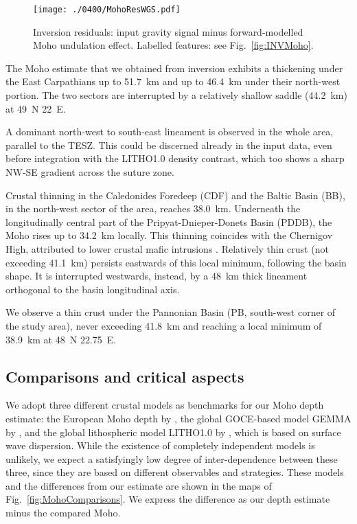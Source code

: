 {\begin{figure}
	\begin{adjustbox}{center}
	\texttt{[image: ./0400/MohoResWGS.pdf]}
	\end{adjustbox}
	\caption{Inversion residuals: input gravity signal minus forward-modelled Moho undulation effect. Labelled features: see Fig.~\ref{fig:INVMoho}.}
	\label{fig:INVResMoho}
\end{figure}

The Moho estimate that we obtained from inversion exhibits a thickening under the East Carpathians up to 51.7~km and up to 46.4~km under their north-west portion.
The two sectors are interrupted by a relatively shallow saddle (44.2~km) at 49\textdegree~N 22\textdegree~E.

A dominant north-west to south-east lineament is observed in the whole area, parallel to the TESZ.
This could be discerned already in the input data, even before integration with the {LITHO1.0} density contrast, which too shows a sharp NW-SE gradient across the suture zone.

Crustal thinning  in the Caledonides Foredeep (CDF) and the Baltic Basin (BB), in the north-west sector of the area, reaches 38.0~km.
Underneath the longitudinally central part of the Pripyat-Dnieper-Donets Basin (PDDB), the Moho rises up to 34.2~km locally. This thinning coincides with the Chernigov High, attributed to lower crustal mafic intrusions \parencite{Starostenko2018}.
Relatively thin crust (not exceeding 41.1~km) persists eastwards of this local minimum, following the basin shape.
It is interrupted westwards, instead, by a 48~km thick lineament orthogonal to the basin longitudinal axis.

We observe a thin crust under the Pannonian Basin (PB, south-west corner of the study area), never exceeding 41.8~km and reaching a local minimum of 38.9~km at 48\textdegree~N 22.75\textdegree~E.

\subsection{Comparisons and critical aspects}
\label{ss:Appl:DiscGravComp}

We adopt three different crustal models as benchmarks for our Moho depth estimate: the European Moho depth by \textcite{Grad2009}, the global GOCE-based model GEMMA by \textcite{Reguzzoni2015}, and the global lithospheric model {LITHO1.0} by \textcite{Pasyanos2014}, which is based on surface wave dispersion.
While the existence of completely independent models is unlikely, we expect a satisfyingly low degree of inter-dependence between these three, since they are based on different observables and strategies.
These models and the differences from our estimate are shown in the maps of Fig.~\ref{fig:MohoComparisons}.
We express the difference as our depth estimate minus the compared Moho.

}
